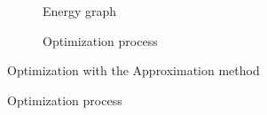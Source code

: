 \documentclass[
  letterpaper,
  DIV=11,
  numbers=noendperiod]{scrartcl}
\begin{document}
\begin{figure}

\begin{minipage}{0.50\linewidth}

\begin{figure}[H]


\caption{\label{fig-surus}Energy graph}

\end{figure}%

\end{minipage}%
%
\begin{minipage}{0.50\linewidth}

\begin{figure}[H]


\caption{\label{fig-hanno}Optimization process}

\end{figure}%

\end{minipage}%
\newline
\begin{minipage}{0.50\linewidth}
Optimization with the Approximation method\end{minipage}%

\end{figure}%
\end{document}
